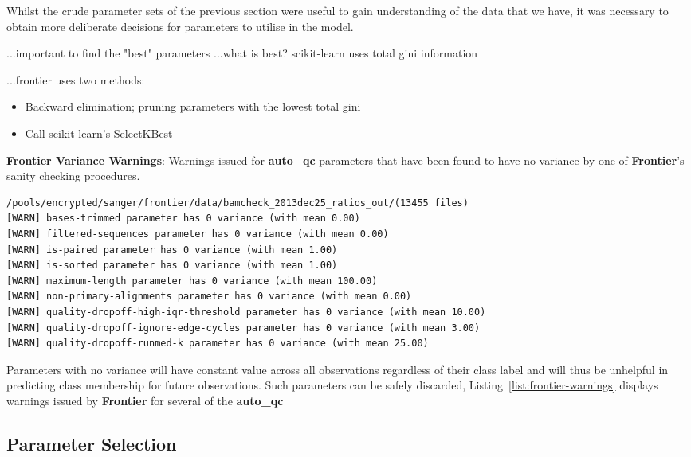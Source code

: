 Whilst the crude parameter sets of the previous section were useful to gain
understanding of the data that we have, it was necessary to obtain more
deliberate decisions for parameters to utilise in the model.

...important to find the "best" parameters
...what is best? scikit-learn uses total gini information

...frontier uses two methods:
\begin{itemize}
    \item Backward elimination; pruning parameters with the lowest total gini
    \item Call scikit-learn's SelectKBest
\end{itemize}

\begin{listing}[H]
    \caption[frontier-warnings]{\textbf{Frontier Variance Warnings}:
        Warnings issued for \textbf{auto\_qc} parameters that have been found to
        have no variance by one of \textbf{Frontier}'s sanity checking procedures.}
    \label{list:frontier-warnings}
    \begin{verbatim}
/pools/encrypted/sanger/frontier/data/bamcheck_2013dec25_ratios_out/(13455 files)
[WARN] bases-trimmed parameter has 0 variance (with mean 0.00)
[WARN] filtered-sequences parameter has 0 variance (with mean 0.00)
[WARN] is-paired parameter has 0 variance (with mean 1.00)
[WARN] is-sorted parameter has 0 variance (with mean 1.00)
[WARN] maximum-length parameter has 0 variance (with mean 100.00)
[WARN] non-primary-alignments parameter has 0 variance (with mean 0.00)
[WARN] quality-dropoff-high-iqr-threshold parameter has 0 variance (with mean 10.00)
[WARN] quality-dropoff-ignore-edge-cycles parameter has 0 variance (with mean 3.00)
[WARN] quality-dropoff-runmed-k parameter has 0 variance (with mean 25.00)
    \end{verbatim}
\end{listing}

Parameters with no variance will have constant value across all observations
regardless of their class label and will thus be unhelpful in predicting class
membership for future observations. Such parameters can be safely discarded,
Listing~\ref{list:frontier-warnings} displays warnings issued by
\textbf{Frontier} for several of the \textbf{auto\_qc}
\subsection{Parameter Selection}


